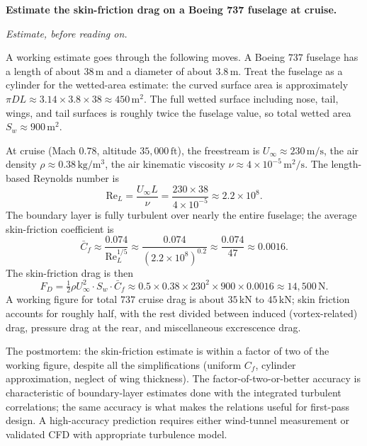 \begin{estimation}
\textbf{Estimate the skin-friction drag on a Boeing 737 fuselage at
cruise.}

\smallskip
\textit{Estimate, before reading on.}

\smallskip
A working estimate goes through the following moves. A Boeing
$737$ fuselage has a length of about $38\,\si{\meter}$ and a
diameter of about $3.8\,\si{\meter}$. Treat the fuselage as a
cylinder for the wetted-area estimate: the curved surface area is
approximately $\pi D L \approx 3.14 \times 3.8 \times 38
\approx 450\,\si{\meter}^2$. The full wetted surface including
nose, tail, wings, and tail surfaces is roughly twice the
fuselage value, so total wetted area $S_w \approx 900\,\si{\meter}
^2$.

At cruise (Mach $0.78$, altitude $35{,}000\,\text{ft}$), the
freestream is $U_\infty \approx 230\,\si{\meter\per\second}$,
the air density $\rho \approx 0.38\,\si{\kilogram\per\meter\cubed}$,
the air kinematic viscosity $\nu \approx 4\times 10^{-5}\,\si{\meter
}^2/\si{\second}$. The length-based Reynolds number is
\[
\text{Re}_L = \frac{U_\infty L}{\nu} = \frac{230 \times 38}{4
\times 10^{-5}} \approx 2.2\times 10^8.
\]
The boundary layer is fully turbulent over nearly the entire
fuselage; the average skin-friction coefficient is
\[
\bar{C}_f \approx \frac{0.074}{\text{Re}_L^{1/5}} \approx
\frac{0.074}{(2.2\times 10^8)^{0.2}} \approx \frac{0.074}{47}
\approx 0.0016.
\]
The skin-friction drag is then
\[
F_D = \tfrac{1}{2}\rho U_\infty^2 \cdot S_w \cdot \bar{C}_f
\approx 0.5 \times 0.38 \times 230^2 \times 900 \times 0.0016
\approx 14{,}500\,\si{\newton}.
\]
A working figure for total $737$ cruise drag is about $35\,\text{kN}$
to $45\,\text{kN}$; skin friction accounts for roughly half, with
the rest divided between induced (vortex-related) drag, pressure
drag at the rear, and miscellaneous excrescence drag.

The postmortem: the skin-friction estimate is within a factor of
two of the working figure, despite all the simplifications
(uniform $C_f$, cylinder approximation, neglect of wing thickness).
The factor-of-two-or-better accuracy is characteristic of
boundary-layer estimates done with the integrated turbulent
correlations; the same accuracy is what makes the relations useful
for first-pass design. A high-accuracy prediction requires
either wind-tunnel measurement or validated CFD with appropriate
turbulence model.
\end{estimation}

